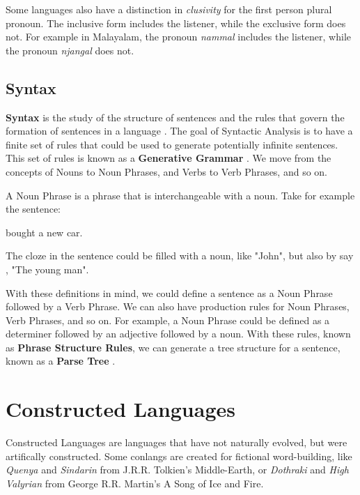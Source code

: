 Some languages also have a distinction in \textit{clusivity} for the first person plural pronoun. The inclusive form includes the listener, while the exclusive form does not.
For example in Malayalam, the pronoun \textit{nammal} includes the listener, while the pronoun \textit{njangal} does not.

\subsection{Syntax}
\textbf{Syntax} is the study of the structure of sentences and the rules that govern the formation of sentences in a language \cite{trask2007language}.
The goal of Syntactic Analysis is to have a finite set of rules that could be used to generate potentially infinite sentences. This set of rules is known as 
a \textbf{Generative Grammar} \cite{yule2020StudyLanguage}. We move from the concepts of Nouns to Noun Phrases, and Verbs to Verb Phrases, and so on.

A Noun Phrase is a phrase that is interchangeable with a noun. Take for example the sentence:

\begin{center}
    \underline{\hspace{2cm}} bought a new car.
\end{center}

The cloze in the sentence could be filled with a noun, like "John", but also by say , "The young man".

With these definitions in mind, we could define a sentence as a Noun Phrase followed by a Verb Phrase. We can also have production rules for 
Noun Phrases, Verb Phrases, and so on. For example, a Noun Phrase could be defined as a determiner followed by an adjective followed by a noun.
With these rules, known as \textbf{Phrase Structure Rules}, we can generate a tree structure for a sentence, known as a \textbf{Parse Tree} \cite{jm3}.




\section{Constructed Languages}
Constructed Languages are languages that have not naturally evolved, but were artifically constructed. Some conlangs are created for fictional word-building,
like \textit{Quenya} and \textit{Sindarin} from J.R.R. Tolkien's Middle-Earth, or \textit{Dothraki} and \textit{High Valyrian} from George R.R. Martin's A Song of Ice and Fire.

